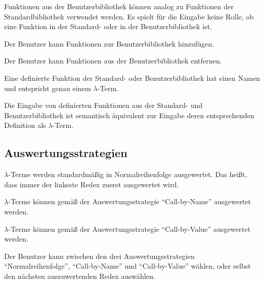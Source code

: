 \documentclass[parskip=full,11pt,twoside]{scrartcl}
\begin{document}
Funktionen aus der Benutzerbibliothek können analog zu Funktionen der Standardbibliothek verwendet werden. Es spielt für die Eingabe keine Rolle, ob eine Funktion in der Standard- oder in der Benutzerbibliothek ist.

Der Benutzer kann Funktionen zur Benutzerbibliothek hinzufügen.

Der Benutzer kann Funktionen aus der Benutzerbibliothek entfernen.

Eine definierte Funktion der Standard- oder Benutzerbibliothek hat einen Namen und entspricht genau einem $\lambda$-Term.

Die Eingabe von definierten Funktionen aus der Standard- und Benutzerbibliothek ist semantisch äquivalent zur Eingabe deren entsprechenden Definition als $\lambda$-Term.









\subsection{Auswertungsstrategien}

$\lambda$-Terme werden standardmäßig in Normalreihenfolge ausgewertet. Das heißt, dass immer der linkeste Redex zuerst ausgewertet wird.

$\lambda$-Terme können gemäß der Auswertungsstrategie \enquote{Call-by-Name} ausgewertet werden.

$\lambda$-Terme können gemäß der Auswertungsstrategie \enquote{Call-by-Value} ausgewertet werden.

Der Benutzer kann zwischen den drei Auswertungsstrategien \enquote{Normalreihenfolge}, \enquote{Call-by-Name} und \enquote{Call-by-Value} wählen, oder selbst den nächsten auszuwertenden Redex auswählen.
\end{document}
